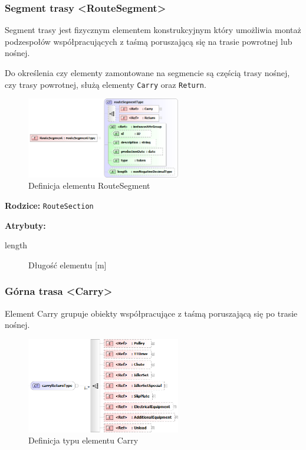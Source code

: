 \documentclass[12pt,a4paper]{article}
\begin{document}
\subsubsection{Segment trasy <RouteSegment>}
Segment trasy jest fizycznym elementem konstrukcyjnym który umożliwia montaż
podzespołów współpracujących z taśmą poruszającą się na trasie powrotnej lub
nośnej.

Do określenia czy elementy zamontowane na segmencie są częścią trasy nośnej, czy
trasy powrotnej, służą elementy {\tt Carry} oraz {\tt Return}.

\begin{figure}[H]
  \centering
  \includegraphics[width=0.6\textwidth]{png/liquid/RouteSegment}
  \caption{Definicja elementu RouteSegment}
  \label{fig:routeSegment-xsd}
\end{figure}

\noindent\textbf{Rodzice:} \texttt{RouteSection}

\noindent\textbf{Atrybuty:}
\begin{description}
\item[length] Długość elementu [m]
\end{description}


\subsubsection{Górna trasa <Carry>}
Element Carry grupuje obiekty współpracujące z taśmą poruszającą się po trasie
nośnej.

\begin{figure}[H]
  \centering
  \includegraphics[width=0.6\textwidth]{png/liquid/carryReturnType}
  \caption{Definicja typu elementu Carry}
  \label{fig:carryReturnType-xsd}
\end{figure}
\end{document}
